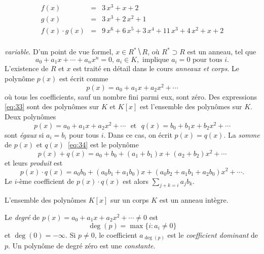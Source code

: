 \begin{example}
  \label{exe:33}
  \begin{eqnarray*}
    f(x) & = &  3 \, x^{3} + x + 2 \\
    g(x) & = & 3 \, x^{3} + 2 \, x^{2} + 1 \\
    f(x) ⋅g(x) & = & 9 \, x^{6} + 6 \, x^{5} + 3 \, x^{4} + 11 \, x^{3} + 4 \,  x^{2} + x + 2 \\ 
  \end{eqnarray*}
\end{example}

\emph{variable}.
D'un point de vue formel, $x ∈ R^* ⧹R$, où $R^*⊃R$ est un anneau, tel que
\begin{displaymath}
  a_0+ a_1x + \cdots + a_n x^n =0, \, a_i ∈K, \text{ implique } a_i=0 \text{ pour tous }i.  
\end{displaymath}
L'existence de $R$ et $x$ est traité en détail dans le cours \emph{anneaux et corps}. 
 Le polynôme $p(x)$ est écrit comme
\begin{displaymath}
  p(x) = a_0 + a_1x + a_2x^2 + \cdots
\end{displaymath}
où tous les  coefficients, sauf un nombre fini parmi eux, sont zéro.
Des expressions \eqref{eq:33} sont des polynômes sur $K$  et $K[x]$ est l'ensemble des polynômes sur $K$. Deux polynômes
\begin{equation}
  \label{eq:34}
  p(x) = a_0 + a_1x + a_2x^2 + \cdots \,\,\text{ et }  \,\, q(x) = b_0 + b_1x + b_2x^2 + \cdots
  \end{equation}
  sont \emph{égaux} si $a_i  =b_i$ pour tous $i$. Dans ce cas, on écrit $p(x) = q(x)$.
La \emph{somme} de $p(x)$ et $q(x)$~\eqref{eq:34} est le polynôme
\begin{displaymath}
  p(x) + q(x)  = a_0+b_0 + (a_1+b_1)x + (a_2+b_2)x^2 + \cdots
\end{displaymath}
et leurs \emph{produit} est
\begin{equation}
  \label{ceq:21}
  p(x) ⋅q(x) = a_0 b_0 + (a_0b_1 +a_1b_0) x + (a_0b_2+ a_1b_1 + a_2b_0)x^2 + \cdots .
\end{equation}
Le $i$-ème coefficient de $p(x)⋅q(x)$ est alors  $∑_{j+k=i}a_jb_k$.

\begin{theorem}
  \label{thr:43}
  L'ensemble des polynômes $K[x]$ sur un corps $K$ est un anneau intègre.
\end{theorem}

Le \emph{degré} de $p(x) = a_0 + a_1x + a_2x^2 + \cdots \neq 0$ est 
\begin{displaymath}
  \deg(p) = \max\{i \colon  a_i \neq 0\}
\end{displaymath}
et $\deg(0) = -\infty$. 
Si $p \neq 0$, le coefficient $a_{\deg(p)}$ est le \emph{coefficient dominant} de $p$. 
Un polynôme de degré zéro est une \emph{constante}. 

